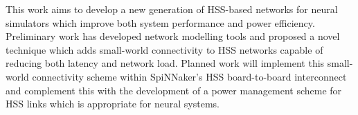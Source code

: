 	This work aims to develop a new generation of HSS-based networks for neural
	simulators which improve both system performance and power efficiency.
	Preliminary work has developed network modelling tools and proposed a novel
	technique which adds small-world connectivity to HSS networks capable of
	reducing both latency and network load. Planned work will implement this
	small-world connectivity scheme within SpiNNaker's HSS board-to-board
	interconnect and complement this with the development of a power management
	scheme for HSS links which is appropriate for neural systems.
